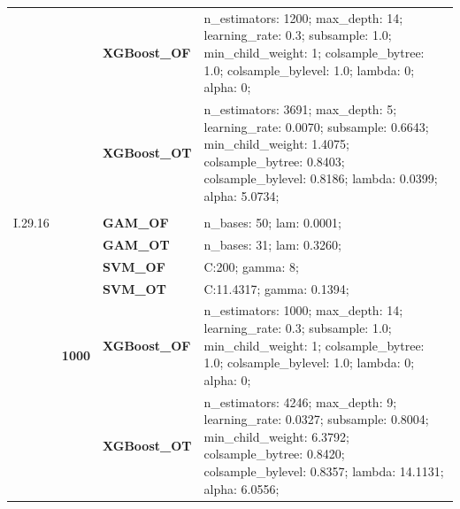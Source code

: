 \documentclass[runningheads]{llncs}
\begin{document}
\begin{table}
\begin{tabularx}{\textwidth}{>{\RaggedRight\arraybackslash}m{1.6cm}p{1.225cm}p{2.05cm}>{\RaggedRight\arraybackslash}X}
        \textbf{}                               & \textbf{}                         & \textbf{XGBoost\_OF} & n\_estimators: 1200; max\_depth: 14; learning\_rate: 0.3; subsample: 1.0; min\_child\_weight: 1; colsample\_bytree: 1.0; colsample\_bylevel: 1.0; lambda: 0; alpha: 0;                            \\
        \textbf{}                               & \textbf{}                         & \textbf{XGBoost\_OT} & n\_estimators: 3691; max\_depth: 5; learning\_rate: 0.0070; subsample: 0.6643; min\_child\_weight: 1.4075; colsample\_bytree: 0.8403; colsample\_bylevel: 0.8186; lambda: 0.0399; alpha: 5.0734;  \\
        \cline{1-4}
        \multirow[t]{14}{=}{\textbf{Feynman                                                                                                                                                                                                                                                                    \\I.29.16}} & \multirow[t]{7}{*}{\textbf{1000}} & \textbf{GAM\_OF} & n\_bases: 50; lam: 0.0001;  \\
        \textbf{}                               & \textbf{}                         & \textbf{GAM\_OT}     & n\_bases: 31; lam: 0.3260;                                                                                                                                                                        \\
        \textbf{}                               & \textbf{}                         & \textbf{SVM\_OF}     & C:\@200; gamma: 8;                                                                                                                                                                                 \\
        \textbf{}                               & \textbf{}                         & \textbf{SVM\_OT}     & C:\@11.4317; gamma: 0.1394;                                                                                                                                                                        \\
        \textbf{}                               & \textbf{}                         & \textbf{XGBoost\_OF} & n\_estimators: 1000; max\_depth: 14; learning\_rate: 0.3; subsample: 1.0; min\_child\_weight: 1; colsample\_bytree: 1.0; colsample\_bylevel: 1.0; lambda: 0; alpha: 0;                            \\
        \textbf{}                               & \textbf{}                         & \textbf{XGBoost\_OT} & n\_estimators: 4246; max\_depth: 9; learning\_rate: 0.0327; subsample: 0.8004; min\_child\_weight: 6.3792; colsample\_bytree: 0.8420; colsample\_bylevel: 0.8357; lambda: 14.1131; alpha: 6.0556; \\

\end{tabularx}
\end{table}
\end{document}
